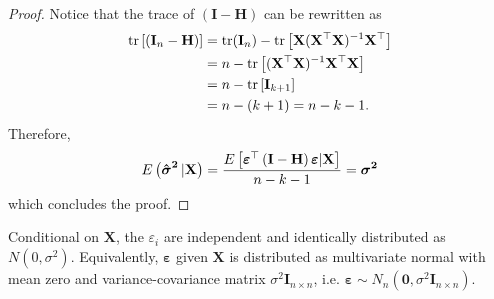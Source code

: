 \begin{proof}
    Notice that the trace of $\left(\mathbf{I} - \mathbf{H}\right)$ can be rewritten as
    \begin{align*}
        \operatorname{\text{tr}}\left[\left(\mathbf{I}_n - \mathbf{H}\right)\right] &= \operatorname{\text{tr}}(\mathbf{I}_n) - \operatorname{\text{tr}}\left[\mathbf{X}(\mathbf{X}^\top\mathbf{X})^{-1}\mathbf{X}^\top\right] \\
        &= n - \operatorname{\text{tr}}\left[ (\mathbf{X}^\top\mathbf{X})^{-1}\mathbf{X}^\top\mathbf{X} \right] \\
         &= n - \operatorname{\text{tr}}\left[\mathbf{I}_{k + 1} \right] \\
        &= n - (k + 1) = n - k - 1.
    \end{align*}
    Therefore,
    \begin{align*}
        E\left(\operatorname{\mathbf{\hat{\boldsymbol{\sigma}}^2}}|\mathbf{X}\right) = \frac{ E\left[\boldsymbol{\varepsilon}^\top \left(\mathbf{I} - \mathbf{H}\right)\boldsymbol{\varepsilon}|\mathbf{X}\right]}{n - k - 1} = \boldsymbol{\sigma^2}
    \end{align*}
    which concludes the proof.
\end{proof}
\begin{assumption} \label{as:normality_of_errors}
    Conditional on $\mathbf{X}$, the $\varepsilon_i$ are independent and identically distributed as $N(0, \sigma^2)$. Equivalently, $\boldsymbol{\varepsilon}$ given $\mathbf{X}$ is distributed as multivariate normal with mean zero and variance-covariance matrix $\sigma^2 \mathbf{I}_{n \times n}$, i.e. $\boldsymbol{\varepsilon} \sim N_n(\mathbf{0}, \sigma^2 \mathbf{I}_{n \times n})$.
\end{assumption}